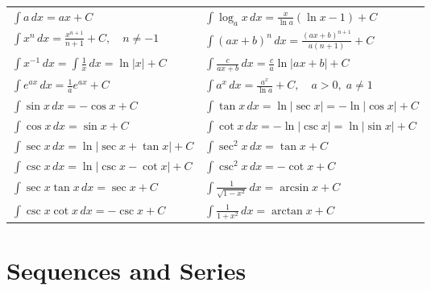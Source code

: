 \documentclass[a4paper,11pt]{article}
\begin{document}
\begin{tcolorbox}[breakable]
    \keepXColumns
    \begin{tabularx}{\textwidth}{X|X}
        $\int a \, dx = ax + C$ &  
        $\int \log_a x \, dx = \frac{x}{\ln{a}} (\ln{x} - 1) + C$ \\[12pt] 

        $\int x^n \, dx = \frac{x^{n+1}}{n+1} + C,\quad n \neq -1$ &
        $\int (ax+b)^n \, dx = \frac{(ax+b)^{n+1}}{a(n+1)} + C$ \\[12pt]
        
        $\int x^{-1} \, dx = \int \frac{1}{x} \, dx = \ln{|x|} + C$ &
        $\int \frac{c}{ax+b} \, dx = \frac{c}{a} \ln{|ax+b|} + C$ \\[12pt] 
        
        $\int e^{ax} \, dx = \frac{1}{a} e^{ax} + C$ &
        $\int a^x \, dx = \frac{a^x}{\ln{a}} + C,\quad a > 0,\; a \neq 1$ \\[12pt]
              
        $\int \sin{x} \, dx = - \cos{x} + C$ &
        $\int \tan{x} \, dx = \ln{|\sec{x}|} = - \ln{|\cos{x}|} + C$ \\[12pt]
              
        $\int \cos{x} \, dx = \sin{x} + C$ &
        $\int \cot{x} \, dx = -\ln{|\csc{x}|} = \ln{|\sin{x}|} + C$ \\[12pt]
        
        $\int \sec{x} \, dx = \ln{|\sec{x} + \tan{x}|} + C$ &
        $\int \sec^2{x} \, dx = \tan{x} + C$ \\[12pt]
        
        $\int \csc{x} \, dx = \ln{|\csc{x} - \cot{x}|} + C$ &
        $\int \csc^2{x} \, dx = -\cot{x} + C$ \\[12pt]
        
        $\int \sec{x} \tan{x} \, dx = \sec{x} + C$ &
        $\int \frac{1}{\sqrt{1-x^2}} \, dx = \arcsin{x} + C$ \\[12pt]
        
        $\int \csc{x} \cot{x} \, dx = -\csc{x} + C$ &
        $\int \frac{1}{1+x^2} \, dx = \arctan{x} + C$ \\[12pt]
    \end{tabularx}
\end{tcolorbox}




\section{Sequences and Series}
\end{document}

